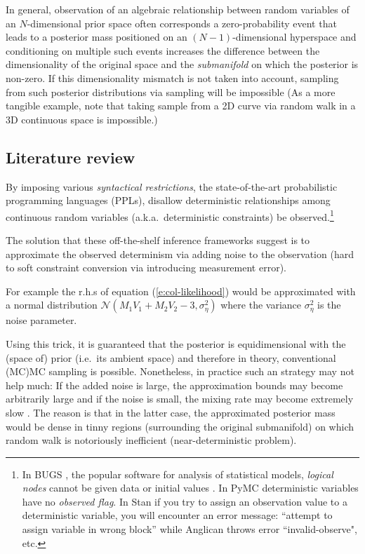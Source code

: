 \documentclass[]{article}
\begin{document}
In general, observation of an algebraic relationship between random variables of an {\footnotesize$N$}-dimensional prior space often corresponds a zero-probability event that leads to a posterior mass positioned on an {\footnotesize$(N\!-\!1)$}-dimensional hyperspace and conditioning on multiple such events increases the difference between the dimensionality of the original space and the \emph{submanifold} on which the posterior is non-zero.  
If this dimensionality mismatch is not taken into account, sampling from such posterior distributions via sampling will be impossible (As a more tangible example, note that taking sample from a 2D curve via random walk in a 3D continuous space is impossible.)  

\subsection{Literature review}
By imposing various %
\emph{syntactical restrictions}, %
the state-of-the-art probabilistic programming languages (PPLs),
disallow deterministic relationships among continuous random variables 
(a.k.a.\ deterministic constraints) be observed.\footnote{
In BUGS \citep{lunn2009bugs}, the popular software for analysis of statistical models, \emph{logical nodes} cannot be given data or initial values .
In PyMC \citep{patil2010pymc} deterministic variables have no \emph{observed flag}. 
In Stan \citep{stan-manual:2014} 
if you try to assign an observation value to a deterministic variable, you will encounter an error message: 
``attempt to assign variable in wrong block'' while 
Anglican \citep{wood2014new} throws error ``invalid-observe", etc.}

The solution that these off-the-shelf inference frameworks suggest is to approximate the observed determinism via adding noise to the observation 
(hard to soft constraint conversion via introducing measurement error).

For example the r.h.s of equation (\ref{e:col-likelihood}) would be 
approximated with a normal distribution
{\footnotesize $\mathcal{N}( M_1 V_1 + M_2 V_2 - 3, \sigma_\eta^2)$}  
where the variance $\sigma_\eta^2$ is the noise parameter.

Using this trick, it is guaranteed that the posterior is equidimensional with the (space of) prior (i.e.\ its ambient space) and therefore in theory, conventional (MC)MC sampling is possible.
Nonetheless, in practice such an strategy may not help much:
If the added noise is large, 
the approximation bounds may become arbitrarily large
and if the noise is small, 
the mixing rate may become extremely slow \citep{chin1987bayesian}. 
The reason is that in the latter case, 
 the approximated posterior mass would be dense in tinny regions (surrounding the original submanifold) on which random walk
is notoriously inefficient (near-deterministic problem).  
\end{document}

